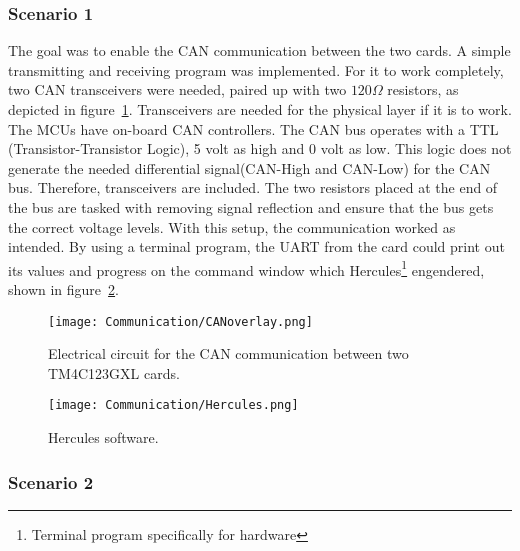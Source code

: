 \subsubsection{Scenario 1}

The goal was to enable the CAN communication between the two cards. A simple transmitting and receiving program was implemented. For it to work completely, two CAN transceivers were needed, paired up with two \(120\Omega\) resistors, as depicted in figure~\ref{fig:CANcom}. Transceivers are needed for the physical layer if it is to work. The MCUs have on-board CAN controllers. The CAN bus operates with a TTL (Transistor-Transistor Logic), 5 volt as high and 0 volt as low. This logic does not generate the needed differential signal(CAN-High and CAN-Low) for the CAN bus. Therefore, transceivers are included. The two resistors placed at the end of the bus are tasked with removing signal reflection and ensure that the bus gets the correct voltage levels. With this setup, the communication worked as intended. By using a terminal program, the UART from the card could print out its values and progress on the command window which Hercules\footnote{Terminal program specifically for hardware} engendered, shown in figure~\ref{fig:Hercules}.
\begin{figure}[!ht]
\centering
\texttt{[image: Communication/CANoverlay.png]}
\caption{Electrical circuit for the CAN communication between two TM4C123GXL cards.}
\label{fig:CANcom}
\end{figure}
\begin{figure}[!ht]
\centering
\texttt{[image: Communication/Hercules.png]}
\caption{Hercules software.}
\label{fig:Hercules}
\end{figure}
\subsubsection{Scenario 2}


